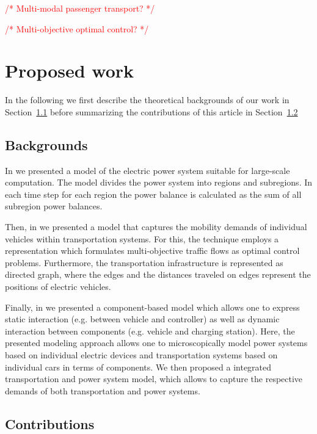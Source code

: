 \documentclass[conference]{IEEEtran}
\newcommand{\todo}[1]{\textcolor{red}{/* #1 */}}
\begin{document}
	\todo{Multi-modal passenger transport?}
	
	\todo{Multi-objective optimal control?}
	
	\section{Proposed work}
	\label{proposed_work}
	
	In the following we first describe the theoretical backgrounds of our work in Section~\ref{backgrounds} before summarizing the contributions of this article in Section~\ref{contributions}
	
	\subsection{Backgrounds}
	\label{backgrounds}
	
	In \cite{Hackenberg2012} we presented a model of the electric power system suitable for large-scale computation. The model divides the power system into regions and subregions. In each time step for each region the power balance is calculated as the sum of all subregion power balances.
	
	Then, in \cite{ascher2014early} we presented a model that captures the mobility demands of individual vehicles within transportation systems. For this, the technique employs a representation which formulates multi-objective traffic flows as optimal control problems. Furthermore, the transportation infrastructure is represented as directed graph, where the edges and the distances traveled on edges represent the positions of electric vehicles.
	
	Finally, in \cite{ascher2015integrated} we presented a component-based model which allows one to express static interaction (e.g. between vehicle and controller) as well as dynamic interaction between components (e.g. vehicle and charging station). Here, the presented modeling approach allows one to microscopically model power systems based on individual electric devices and transportation systems based on individual cars in terms of components. We then proposed a integrated transportation and power system model, which allows to capture the respective demands of both transportation and power systems.
	
	\subsection{Contributions}
	\label{contributions}
	
\end{document}
